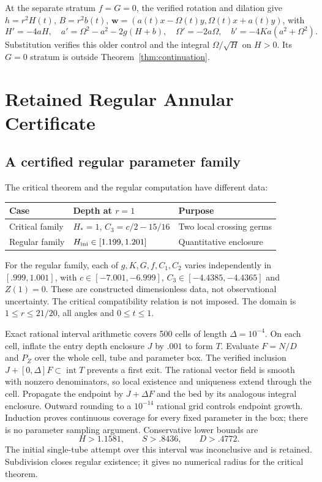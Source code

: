 \documentclass[12pt,a4paper,oneside]{report}
\numberwithin{equation}{chapter}
\theoremstyle{remark}\newtheorem{remark}[theorem]{Remark}
\begin{document}
At the separate stratum $f=G=0$, the verified rotation and dilation give
$h=r^2H(t)$, $B=r^2b(t)$,
$\mathbf w=(a(t)x-\Omega(t)y,\Omega(t)x+a(t)y)$, with
\begin{equation}
 H'=-4aH,\quad a'=\Omega^2-a^2-2g(H+b),\quad
 \Omega'=-2a\Omega,\quad b'=-4Ka(a^2+\Omega^2).
\end{equation}
Substitution verifies this older control and the integral $\Omega/\sqrt H$
on $H>0$. Its $G=0$ stratum is outside Theorem~\ref{thm:continuation}.



\chapter{Retained Regular Annular Certificate}\label{ch:conclusions}
\section{A certified regular parameter family}
The critical theorem and the regular computation have different data:
\begin{center}\small
\begin{tabular}{lll}\toprule
Case & Depth at $r=1$ & Purpose\\\midrule
Critical family & $H_*=1$, $C_3=c/2-15/16$ & Two local crossing germs\\
Regular family & $H_{\rm ini}\in[1.199,1.201]$ & Quantitative enclosure\\\bottomrule
\end{tabular}
\end{center}
For the regular family, each of $g,K,G,f,C_1,C_2$ varies independently in
$[.999,1.001]$, with $c\in[-7.001,-6.999]$,
$C_3\in[-4.4385,-4.4365]$ and $Z(1)=0$. These are constructed dimensionless
data, not observational uncertainty. The critical compatibility relation is
not imposed. The domain is $1\le r\le21/20$, all angles and $0\le t\le1$.

Exact rational interval arithmetic covers 500 cells of length $\Delta=10^{-4}$.
On each cell, inflate the entry depth enclosure $J$ by $.001$ to form $T$.
Evaluate $F=N/D$ and $P_Z$ over the whole cell, tube and parameter box. The
verified inclusion $J+[0,\Delta]F\subset\operatorname{int}T$ prevents a first
exit. The rational vector field is smooth with nonzero denominators, so local
existence and uniqueness extend through the cell. Propagate the endpoint
by $J+\Delta F$ and the bed by its analogous integral enclosure. Outward
rounding to a $10^{-14}$ rational grid controls endpoint growth. Induction
proves continuous coverage for every fixed parameter in the box; there is no
parameter sampling argument. Conservative lower bounds are
\[
 H>1.1581,\qquad S>.8436,\qquad D>.4772.
\]
The initial single-tube attempt over this interval was inconclusive and is
retained. Subdivision closes regular existence; it gives no numerical radius
for the critical theorem.
\end{document}
